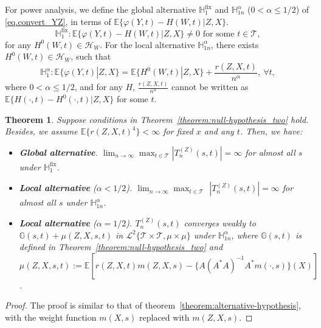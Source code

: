 \documentclass[
  12pt]{article}
\newtheorem{theorem}{Theorem}
\def\to{\rightarrow}
\def\mE{\mathbb{E}}
\def\mH{\mathbb{H}}
\def\cH{\mathcal{H}}
\def\cT{\mathcal{T}}
\def\mE{\mathbb{E}}
\begin{document}
For power analysis, we define the global alternative $\mH^{\mathrm{fix}}_1$
and $\mH^\alpha_{1n}$ ($0 < \alpha \leq 1/2$) of \eqref{eq.convert_YZ}, in terms of $\mathbb{E}\{ \varphi(Y,t) -H(W,t) |Z,X\}$.
\begin{equation*}
    \mH^{\mathrm{fix}}_1: \mathbb{E}\{ \varphi(Y,t) -H(W,t) |Z,X\} \neq 0 \text{ for some $t \in \cT$},
\end{equation*}
for any $H^0(W,t) \in \cH_W$. For the local alternative $\mH^\alpha_{1n}$, there exists $H^0(W,t) \in \cH_W$, such that
\begin{equation*}
    \mH^\alpha_1: \mathbb{E}\{ \varphi(Y,t) |Z,X\} =  \mE\{H^0(W,t)|Z,X\} + \frac{r(Z,X,t)}{n^\alpha}, \ \forall t,
\end{equation*}
where $0 < \alpha \leq 1/2$, and for any $H$, $\frac{r(Z,X,t)}{n^\alpha}$ cannot be written as $\mE\{H(\cdot,t)-H^0(\cdot,t)|Z,X\}$ for some $t$. 

\begin{theorem}
\label{theorem:alternative-hypothesis_two}
Suppose conditions in Theorem~\ref{theorem:null-hypothesis_two} hold. Besides, we assume $\mE\{r(Z,X,t)^4\}<\infty$ for fixed $x$ and any $t$. Then, we have:
\begin{itemize}[noitemsep,topsep=0pt]
    \item[\textbf{\emph{(i)}}] \textbf{Global alternative}.  $\lim_{n \to \infty} \max_{t \in \cT}  |T_n^{(Z)}(s,t)| = \infty$ for almost all $s$ under $\mH_1^{\mathrm{fix}}$. 
    \item[\textbf{\emph{(ii)}}] \textbf{Local alternative} ($\alpha < 1/2$). $\lim_{n \to \infty} \max_{t \in \cT}$ $|T^{(Z)}_n(s,t)| = \infty$ for almost all $s$ under $\mH^\alpha_{1n}$. 
    \item[\textbf{\emph{(iii)}}] \textbf{Local alternative} ($\alpha = 1/2$). $T^{(Z)}_n(s,t)$ converges weakly to $\mathbb{G}(s,t)+\mu(Z,X,s,t)$ in $\mathcal{L}^{2}\{\cT \times \cT, \mu \times \mu \}$ under $\mH^\alpha_{1n}$, where $\mathbb{G}(s,t)$ is defined in Theorem~\ref{theorem:null-hypothesis_two} and $\mu(Z,X,s,t):=\mathbb{E} [r(Z,X,t)m(Z,X,s) -\{A(A^*A)^{-1}A^*m(\cdot,s)\}(X)]$.
\end{itemize}
\end{theorem}
\begin{proof}
    The proof is similar to that of theorem~\ref{theorem:alternative-hypothesis}, with the weight function $m(X,s)$ replaced with $m(Z,X,s)$.
\end{proof}
\end{document}
